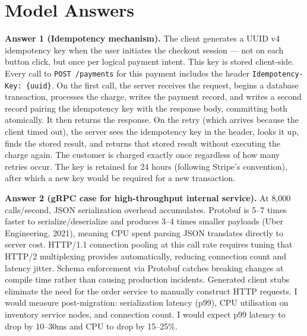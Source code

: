\documentclass[11pt,a4paper]{article}
\begin{document}
\newpage
\section*{Model Answers}

\begin{answerbox}
\textbf{Answer 1 (Idempotency mechanism).} The client generates a UUID v4 idempotency key when the user initiates the checkout session --- not on each button click, but once per logical payment intent. This key is stored client-side. Every call to \texttt{POST /payments} for this payment includes the header \texttt{Idempotency-Key: \{uuid\}}. On the first call, the server receives the request, begins a database transaction, processes the charge, writes the payment record, and writes a second record pairing the idempotency key with the response body, committing both atomically. It then returns the response. On the retry (which arrives because the client timed out), the server sees the idempotency key in the header, looks it up, finds the stored result, and returns that stored result without executing the charge again. The customer is charged exactly once regardless of how many retries occur. The key is retained for 24 hours (following Stripe's convention), after which a new key would be required for a new transaction.

\vspace{8pt}
\textbf{Answer 2 (gRPC case for high-throughput internal service).} At 8,000 calls/second, JSON serialization overhead accumulates. Protobuf is 5--7 times faster to serialize/deserialize and produces 3--4 times smaller payloads (Uber Engineering, 2021), meaning CPU spent parsing JSON translates directly to server cost. HTTP/1.1 connection pooling at this call rate requires tuning that HTTP/2 multiplexing provides automatically, reducing connection count and latency jitter. Schema enforcement via Protobuf catches breaking changes at compile time rather than causing production incidents. Generated client stubs eliminate the need for the order service to manually construct HTTP requests. I would measure post-migration: serialization latency (p99), CPU utilisation on inventory service nodes, and connection count. I would expect p99 latency to drop by 10--30ms and CPU to drop by 15--25\%.


\end{answerbox}
\end{document}
